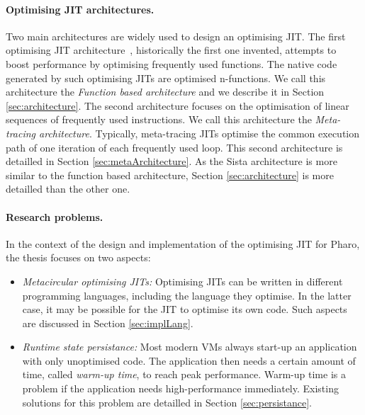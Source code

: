 \documentclass[a4paper,12pt,twoside]{../includes/ThesisStyle}
\begin{document}
\paragraph{Optimising JIT architectures.} Two main architectures are widely used to design an optimising JIT. The first optimising JIT architecture~\cite{UrsPHD}, historically the first one invented, attempts to boost performance by optimising frequently used functions. The native code generated by such optimising JITs are optimised n-functions. We call this architecture the \emph{Function based architecture} and we describe it in Section \ref{sec:architecture}. The second architecture focuses on the optimisation of linear sequences of frequently used instructions. We call this architecture the \emph{Meta-tracing architecture}. Typically, meta-tracing JITs optimise the common execution path of one iteration of each frequently used loop. This second architecture is detailled in Section \ref{sec:metaArchitecture}. As the Sista architecture is more similar to the function based architecture, Section \ref{sec:architecture} is more detailled than the other one.

\paragraph{Research problems.} In the context of the design and implementation of the optimising JIT for Pharo, the thesis focuses on 
two
aspects:
\begin{itemize}
	\item \emph{Metacircular optimising JITs: } Optimising JITs can be written in different programming languages, including the language they optimise. In the latter case, it may be possible for the JIT to optimise its own code. Such aspects are discussed in Section \ref{sec:implLang}.
	\item \emph{Runtime state persistance:} Most modern VMs always start-up an application with only unoptimised code. The application then needs a certain amount of time, called \emph{warm-up time}, to reach peak performance. Warm-up time is a problem if the application needs high-performance immediately. Existing solutions for this problem are detailled in Section \ref{sec:persistance}.
\end{itemize}
\end{document}
